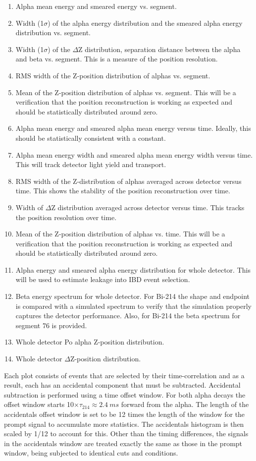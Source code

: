 \begin{enumerate}
\item{Alpha mean energy and smeared energy vs. segment. }
\item{Width (1$\sigma$) of the alpha energy distribution and the smeared alpha energy distribution vs. segment. }
\item{Width (1$\sigma$) of the $\Delta$Z distribution, separation distance between the alpha and beta vs. segment. This is a measure of the position resolution. }
\item{RMS width of the Z-position distribution of alphas vs. segment. }
\item{Mean of the Z-position distribution of alphas vs. segment. This will be a verification that the position reconstruction is working as expected and should be statistically distributed around zero.}
\item{Alpha mean energy and smeared alpha mean energy versus time. Ideally, this should be statistically consistent with a constant.}
\item{Alpha mean energy width and smeared alpha mean energy width versus time. This will track detector light yield and transport.}
\item{RMS width of the Z-distribution of alphas averaged across detector versus time. This shows the stability of the position reconstruction over time.}
\item{Width of $\Delta$Z distribution averaged across detector versus time. This tracks the position resolution over time.}
\item{Mean of the Z-position distribution of alphas vs. time. This will be a verification that the position reconstruction is working as expected and should be statistically distributed around zero.}
\item{Alpha energy and smeared alpha energy distribution for whole detector. This will be used to estimate leakage into IBD event selection.}
\item{Beta energy spectrum for whole detector. For Bi-214 the shape and endpoint is compared with a simulated spectrum to verify that the simulation properly captures the detector performance. Also, for Bi-214 the beta spectrum for segment 76 is provided. }
\item{Whole detector Po alpha Z-position distribution.}
\item{Whole detector $\Delta$Z-position distribution.}
\end{enumerate}
Each plot consists of events that are selected by their time-correlation and as a result, each has an accidental component that must be subtracted. Accidental subtraction is performed using a time offset window. For both alpha decays the offset window starts 10$\times\tau_{214}\approx2.4~ms$ forward from the alpha. The length of the accidentals offset window is set to be 12 times the length of the window for the prompt signal to accumulate more statistics. The accidentals histogram is then scaled by 1/12 to account for this. Other than the timing differences, the signals in the accidentals window are treated exactly the same as those in the prompt window, being subjected to identical cuts and conditions.

